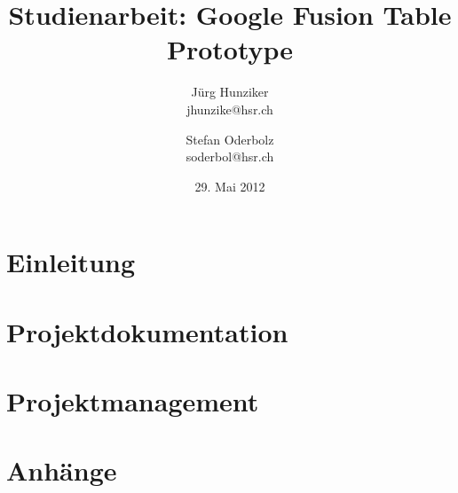 


\title{Studienarbeit: Google Fusion Table Prototype}
\author{Jürg Hunziker\\jhunzike@hsr.ch
		\and
		Stefan Oderbolz\\soderbol@hsr.ch}
\date{29. Mai 2012}






\listoftodos







\tableofcontents

\cleardoublepage


\part{Einleitung}


\part{Projektdokumentation}


\part{Projektmanagement}


\part{Anhänge}

\printglossary[style=altlist,title=Glossar,toctitle=Glossar]




\listoffigures

